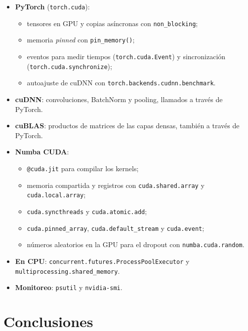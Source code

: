 \documentclass[11pt,letterpaper]{article}
\newcommand{\cod}[1]{\texttt{#1}}
\begin{document}
\begin{itemize}
  \item \textbf{PyTorch} (\cod{torch.cuda}):
    \begin{itemize}
      \item tensores en GPU y copias asíncronas con \cod{non\_blocking};
      \item memoria \textit{pinned} con \cod{pin\_memory()};
      \item eventos para medir tiempos (\cod{torch.cuda.Event}) y sincronización (\cod{torch.cuda.synchronize});
      \item autoajuste de cuDNN con \cod{torch.backends.cudnn.benchmark}.
    \end{itemize}
  \item \textbf{cuDNN}: convoluciones, BatchNorm y pooling, llamados a través de PyTorch.
  \item \textbf{cuBLAS}: productos de matrices de las capas densas, también a través de PyTorch.
  \item \textbf{Numba CUDA}:
    \begin{itemize}
      \item \cod{@cuda.jit} para compilar los kernels;
      \item memoria compartida y registros con \cod{cuda.shared.array} y \cod{cuda.local.array};
      \item \cod{cuda.syncthreads} y \cod{cuda.atomic.add};
      \item \cod{cuda.pinned\_array}, \cod{cuda.default\_stream} y \cod{cuda.event};
      \item números aleatorios en la GPU para el dropout con \cod{numba.cuda.random}.
    \end{itemize}
  \item \textbf{En CPU}: \cod{concurrent.futures.ProcessPoolExecutor} y \cod{multiprocessing.shared\_memory}.
  \item \textbf{Monitoreo}: \cod{psutil} y \cod{nvidia-smi}.
\end{itemize}

\section{Conclusiones}
\end{document}
